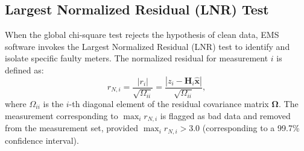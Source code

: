 \documentclass[12pt,a4paper]{report}
\begin{document}
\subsection{Largest Normalized Residual (LNR) Test}
When the global chi-square test rejects the hypothesis of clean data, EMS software invokes
the Largest Normalized Residual (LNR) test to identify and isolate specific faulty meters.
The normalized residual for measurement $i$ is defined as:
\begin{equation}
r_{N,i} = \frac{|r_i|}{\sqrt{\Omega_{ii}}} = \frac{|z_i - \boldsymbol{H}_i \hat{\boldsymbol{x}}|}{\sqrt{\Omega_{ii}}},
\end{equation}
where $\Omega_{ii}$ is the $i$-th diagonal element of the residual covariance matrix $\boldsymbol{\Omega}$.
The measurement corresponding to $\max_i r_{N,i}$ is flagged as bad data and removed from
the measurement set, provided $\max_i r_{N,i} > 3.0$ (corresponding to a 99.7\% confidence interval).
\end{document}
